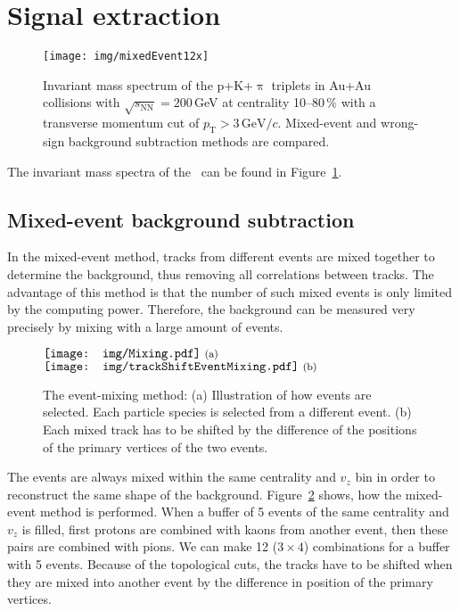 \section{Signal extraction}

\begin{figure}[htb]
\centering
\texttt{[image: img/mixedEvent12x]}
\caption{Invariant mass spectrum of the p+K+$\uppi$ triplets in Au+Au collisions with $\sqrt{s_\mathrm{NN}} = 200\,$GeV at centrality 10--80$\,\%$ with a transverse momentum cut of $p_\mathrm{T} > 3\,\text{GeV}/c$. Mixed-event and wrong-sign background subtraction methods are compared.}
\label{fig:invMass}
\end{figure}

The invariant mass spectra of the \Lambdac\ can be found in Figure~\ref{fig:invMass}\@. 

\subsection{Mixed-event background subtraction}
In the mixed-event method, tracks from different events are mixed together to determine the background, thus removing all correlations between tracks. The advantage of this method is that the number of such mixed events is only limited by the computing power. Therefore, the background can be measured very precisely by mixing with a large amount of events. 

\begin{figure}[htb]
\centering
$
\vcenter{\hbox{\texttt{[image: img/Mixing.pdf]}
\footnotesize{(a)}
}}
$
\hspace*{0.\textwidth}
$
\vcenter{\hbox{\texttt{[image: img/trackShiftEventMixing.pdf]}
\footnotesize{(b)}
}}
$
\caption{The event-mixing method: (a) Illustration of how events are selected. Each particle species is selected from a different event. (b) Each mixed track has to be shifted by the difference of the positions of the primary vertices of the two events.}
\label{fig:mixedIllustrations}
\end{figure}

The events are always mixed within the same centrality and $v_z$ bin in order to reconstruct the same shape of the background. Figure~\ref{fig:mixedIllustrations} shows, how the mixed-event method is performed. When a buffer of 5 events of the same centrality and $v_z$ is filled, first protons are combined with kaons from another event, then these pairs are combined with pions. We can make 12 ($3 \times 4$) combinations for a buffer with 5 events. Because of the topological cuts, the tracks have to be shifted when they are mixed into another event by the difference in position of the primary vertices.


